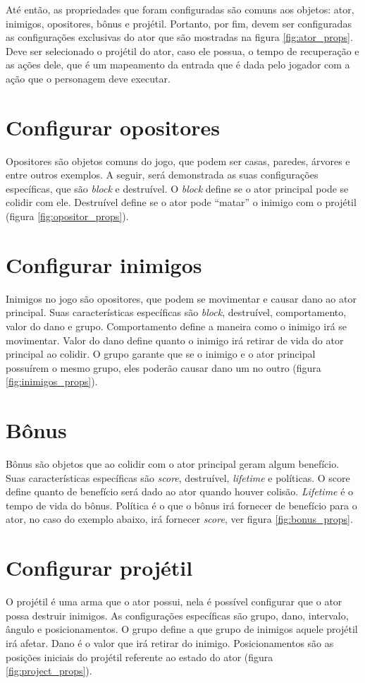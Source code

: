 \documentclass[12pt,oneside,openright,a4paper,english,brazil,sumario=tradicional]{abntex2}
\begin{document}
\begin{anexosenv}
   Até então, as propriedades que foram configuradas são comuns aos objetos: ator, inimigos, opositores, bônus e projétil. Portanto, por fim, devem ser configuradas as configurações exclusivas do ator que são mostradas na figura \ref{fig:ator_props}. Deve ser selecionado o projétil do ator, caso ele possua, o tempo de recuperação e as ações dele, que é um mapeamento da entrada que é dada pelo jogador com a ação que o personagem deve executar.

   \section{Configurar opositores}
   Opositores são objetos comuns do jogo, que podem ser casas, paredes, árvores e entre outros exemplos. A seguir, será demonstrada as suas configurações específicas, que são \emph{block} e destruível. O \emph{block} define se o ator principal pode se colidir com ele. Destruível define se o ator pode “matar” o inimigo com o projétil (figura \ref{fig:opositor_props}).

   \section{Configurar inimigos}
   Inimigos no jogo são opositores, que podem se movimentar e causar dano ao ator principal. Suas características específicas são \emph{block}, destruível, comportamento, valor do dano e grupo. Comportamento define a maneira como o inimigo irá se movimentar. Valor do dano define quanto o inimigo irá retirar de vida do ator principal ao colidir. O grupo garante que se o inimigo e o ator principal possuírem o mesmo grupo, eles poderão causar dano um no outro (figura \ref{fig:inimigos_props}).

   \section{Bônus}
   Bônus são objetos que ao colidir com o ator principal geram algum benefício. Suas características específicas são \emph{score}, destruível, \emph{lifetime} e políticas. O score define quanto de benefício será dado ao ator quando houver colisão. \emph{Lifetime} é o tempo de vida do bônus. Política é o que o bônus irá fornecer de benefício para o ator, no caso do exemplo abaixo, irá fornecer \emph{score}, ver figura \ref{fig:bonus_props}.

   \section{Configurar projétil}
   O projétil é uma arma que o ator possui, nela é possível configurar que o ator possa destruir inimigos. As configurações específicas são grupo, dano, intervalo, ângulo e posicionamentos. O grupo define a que grupo de inimigos aquele projétil irá afetar. Dano é o valor que irá retirar do inimigo. Posicionamentos são as posições iniciais do projétil referente ao estado do ator (figura \ref{fig:project_props}).


\end{anexosenv}
\end{document}
